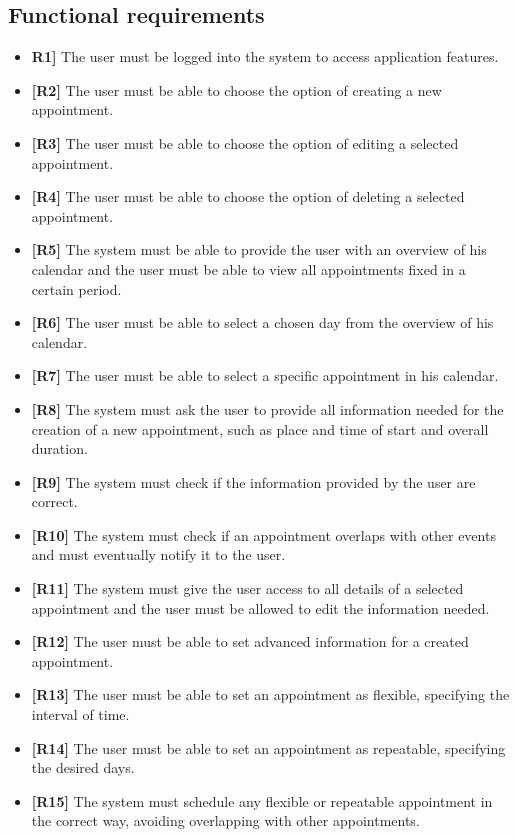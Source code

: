\subsection{Functional requirements}
\begin{itemize}
	\item \textbf{R1]} The user must be logged into the system to access application features.
	\item \textbf{[R2]} The user must be able to choose the option of creating a new appointment.
	\item \textbf{[R3]} The user must be able to choose the option of editing a selected appointment.
	\item \textbf{[R4]} The user must be able to choose the option of deleting a selected appointment.
	\item \textbf{[R5]} The system must be able to provide the user with an overview of his calendar and the user must be able to view all appointments fixed in a certain period.
	\item \textbf{[R6]} The user must be able to select a chosen day from the overview of his calendar.
	\item \textbf{[R7]} The user must be able to select a specific appointment in his calendar.
	\item \textbf{[R8]} The system must ask the user to provide all information needed for the creation of a new appointment, such as place and time of start and overall duration.
	\item \textbf{[R9]} The system must check if the information provided by the user are correct.
	\item \textbf{[R10]} The system must check if an appointment overlaps with other events and must eventually notify it to the user.
	\item \textbf{[R11]} The system must give the user access to all details of a selected appointment and the user must be allowed to edit the information needed.
	\item \textbf{[R12]} The user must be able to set advanced information for a created appointment.
	\item \textbf{[R13]} The user must be able to set an appointment as flexible, specifying the interval of time.
	\item \textbf{[R14]} The user must be able to set an appointment as repeatable, specifying the desired days.
	\item \textbf{[R15]} The system must schedule any flexible or repeatable appointment in the correct way, avoiding overlapping with other appointments.

\end{itemize}
